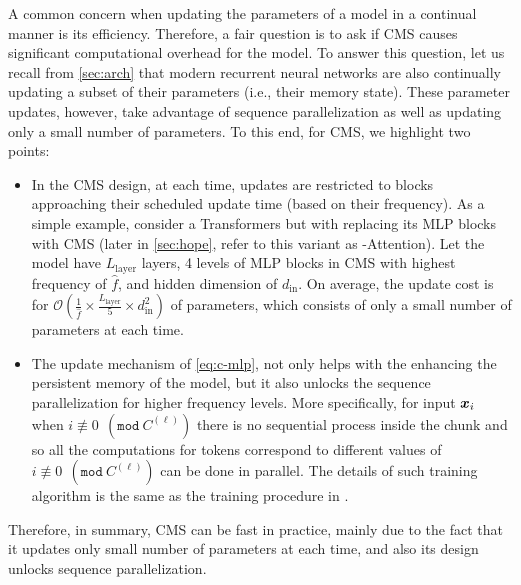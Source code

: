{\label{sec:training-cmlp}
A common concern when updating the parameters of a model in a continual manner is its efficiency. Therefore, a fair question is to ask if CMS causes significant computational overhead for the model. To answer this question, let us recall from \autoref{sec:arch} that modern recurrent neural networks are also continually updating a subset of their parameters (i.e., their memory state). These parameter updates, however, take advantage of sequence parallelization as well as updating only a small number of parameters. To this end, for CMS, we highlight two points: 
\begin{itemize}
    \item In the CMS design, at each time, updates are restricted to blocks approaching their scheduled update time (based on their frequency). As a simple example, consider a Transformers but with replacing its MLP blocks with CMS (later in \autoref{sec:hope}, refer to this variant as \model-Attention). Let the model have $L_{\text{layer}}$ layers, 4 levels of MLP blocks in CMS with highest frequency of $\hat{f}$, and hidden dimension of $d_{\text{in}}$. On average, the update cost is for $\mathcal{O}\left(\frac{1}{\hat{f}} \times \frac{L_{\text{layer}}}{5} \times d_{\text{in}}^2 \right)$ of parameters, which consists of only a small number of parameters at each time. 
    \item The update mechanism of \autoref{eq:c-mlp}, not only helps with the enhancing the persistent memory of the model, but it also unlocks the sequence parallelization for higher frequency levels. More specifically, for input $\boldsymbol{x}_i$ when $i \nequiv 0 \:\: (\texttt{mod} \: C^{(\ell)})$ there is no sequential process inside the chunk and so all the computations for tokens correspond to different values of $i \nequiv 0 \:\: (\texttt{mod} \: C^{(\ell)})$ can be done in parallel. The details of such training algorithm is the same as the training procedure in \citet{sun2024learning, behrouz2024titans}.
\end{itemize}
Therefore, in summary, CMS can be fast in practice, mainly due to the fact that it updates only small number of parameters at each time, and also its design unlocks sequence parallelization.  


}
